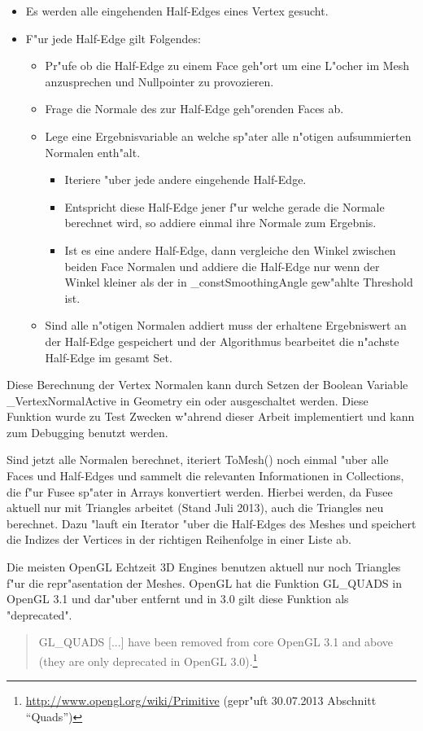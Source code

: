 \documentclass[pagesize, paper=a4, fontsize=12pt,titlepage=true, headings=small, headnosepline, abstractoff, liststotoc, nochapterprefix, plainheadsepline]{scrreprt}
\begin{document}
\begin{itemize}
\item Es werden alle eingehenden Half-Edges eines Vertex gesucht.
\item F"ur jede Half-Edge gilt Folgendes:
	\begin{itemize}
	\item Pr"ufe ob die Half-Edge zu einem Face geh"ort um eine L"ocher im Mesh anzusprechen und Nullpointer zu provozieren.
	\item Frage die Normale des zur Half-Edge geh"orenden Faces ab.
	\item Lege eine Ergebnisvariable an welche sp"ater alle n"otigen aufsummierten Normalen enth"alt.
		\begin{itemize}
		\item Iteriere "uber jede andere eingehende Half-Edge.
		\item Entspricht diese Half-Edge jener f"ur welche gerade die Normale berechnet wird, so addiere einmal ihre Normale zum Ergebnis.
		\item Ist es eine andere Half-Edge, dann vergleiche den Winkel zwischen beiden Face Normalen und addiere die Half-Edge nur wenn der Winkel kleiner als der in \_constSmoothingAngle gew"ahlte Threshold ist.
		\end{itemize}
	\item Sind alle n"otigen Normalen addiert muss der erhaltene Ergebniswert an der Half-Edge gespeichert und der Algorithmus bearbeitet die n"achste Half-Edge im gesamt Set.
	\end{itemize}
\end{itemize}

Diese Berechnung der Vertex Normalen kann durch Setzen der Boolean Variable \_VertexNormalActive in Geometry ein oder ausgeschaltet werden. Diese Funktion wurde zu Test Zwecken w"ahrend dieser Arbeit implementiert und kann zum Debugging benutzt werden.
\newline

Sind jetzt alle Normalen berechnet, iteriert ToMesh() noch einmal "uber alle Faces und Half-Edges und sammelt die relevanten Informationen in Collections, die f"ur Fusee sp"ater in Arrays konvertiert werden. Hierbei werden, da Fusee aktuell nur mit Triangles arbeitet (Stand Juli 2013), auch die Triangles neu berechnet. Dazu "lauft ein Iterator "uber die Half-Edges des Meshes und speichert die Indizes der Vertices in der richtigen Reihenfolge in einer Liste ab.

Die meisten OpenGL Echtzeit 3D Engines benutzen aktuell nur noch Triangles f"ur die repr"asentation der Meshes. OpenGL hat die Funktion GL\_QUADS in OpenGL 3.1 und dar"uber entfernt und in 3.0 gilt diese Funktion als "deprecated".
\begin{quote}GL\_QUADS [...] have been removed from core OpenGL 3.1 and above (they are only deprecated in OpenGL 3.0).\footnote{\url{http://www.opengl.org/wiki/Primitive} (gepr"uft 30.07.2013 Abschnitt "`Quads"')}
\end{quote}
\end{document}
